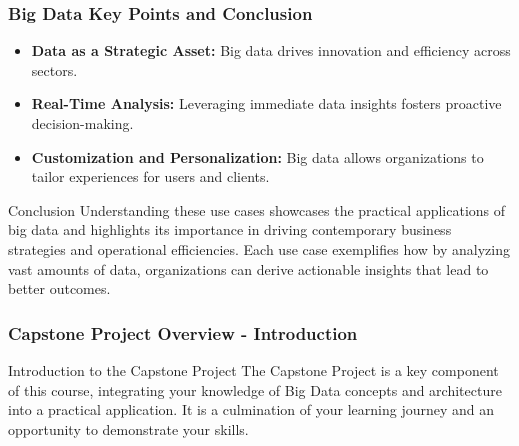 \documentclass[aspectratio=169]{beamer}
\begin{document}
\begin{frame}[fragile]
    \frametitle{Big Data Key Points and Conclusion}
    \begin{itemize}
        \item \textbf{Data as a Strategic Asset:} Big data drives innovation and efficiency across sectors.
        \item \textbf{Real-Time Analysis:} Leveraging immediate data insights fosters proactive decision-making.
        \item \textbf{Customization and Personalization:} Big data allows organizations to tailor experiences for users and clients.
    \end{itemize}

    \begin{block}{Conclusion}
        Understanding these use cases showcases the practical applications of big data and highlights its importance in driving contemporary business strategies and operational efficiencies. Each use case exemplifies how by analyzing vast amounts of data, organizations can derive actionable insights that lead to better outcomes.
    \end{block}
\end{frame}

\begin{frame}[fragile]
    \frametitle{Capstone Project Overview - Introduction}
    \begin{block}{Introduction to the Capstone Project}
        The Capstone Project is a key component of this course, 
        integrating your knowledge of Big Data concepts and architecture into a practical application. 
        It is a culmination of your learning journey and an opportunity to demonstrate your skills.
    \end{block}
\end{frame}
\end{document}
